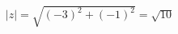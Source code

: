 \documentclass[preview]{standalone}
\begin{document}
\begin{align*}
|z| = \sqrt{   (-3)^2   +   (-1)^2   } = \sqrt{10}
\end{align*}
\end{document}
